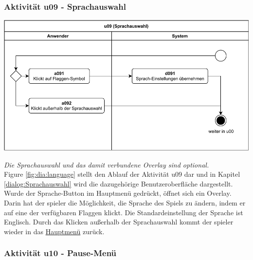 \clearpage

\subsubsection{Aktivität u09 - Sprachauswahl}

\vspace*{1cm}

\includegraphics[width=\linewidth]{diagramme/pdf/UML-Activity-u09.pdf}
\label{fig:dia:language}
\vspace*{0.5cm}

\textit{Die Sprachauswahl und das damit verbundene Overlay sind optional.}
\\
Figure \ref{fig:dia:language} stellt den Ablauf der Aktivität u09 dar und in Kapitel \ref{dialog:Sprachauswahl} wird die dazugehörige Benutzeroberfläche dargestellt.
Wurde der Sprache-Button im Hauptmenü gedrückt, öffnet sich ein Overlay. Darin hat der \gls{spieler} die Möglichkeit, die Sprache des Spiels zu ändern, indem er auf eine der verfügbaren Flaggen klickt. Die Standardeinstellung der Sprache ist Englisch. Durch das Klicken außerhalb der Sprachauswahl kommt der \gls{spieler} wieder in das \hyperref[fig:dia:mainMenu]{Hauptmenü} zurück.

\clearpage


\subsubsection{Aktivität u10 - Pause-Menü}


\vspace*{1cm}


